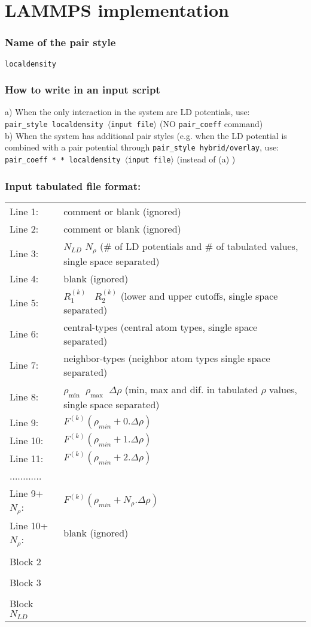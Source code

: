 \documentclass[12pt,a4paper]{article}
\begin{document}
\section*{LAMMPS implementation}
\subsubsection*{Name of the pair style}
\texttt{localdensity}
%
\subsubsection*{How to write in an input script}
a) When the only interaction in the system are LD potentials, use:\\
\texttt{pair\_style localdensity $\langle$input file$\rangle$} (NO \texttt{pair\_coeff} command)\\

\noindent b) When the system has additional pair styles (e.g. when the LD potential is combined with a pair potential through \texttt{pair\_style hybrid/overlay}, use:\\
\texttt{pair\_coeff *  * localdensity $\langle$input file$\rangle$} (instead of (a) )

\subsubsection*{Input tabulated file format:}
\begin{tabular}{l l}
Line 1:   & comment or blank (ignored)\\
Line 2:  & comment or blank (ignored)\\
Line 3:  & $N_{LD}$ $N_{\rho}$ (\# of LD potentials and \# of tabulated values, single space separated)\\
Line 4:  & blank (ignored)\\
Line 5:  & $R_1^{(k)} \; \; \; R_2^{(k)}$ (lower and upper cutoffs, single space separated)\\
Line 6: 	& central-types (central atom types, single space separated)\\
Line 7: 	& neighbor-types (neighbor atom types single space separated)\\
Line 8: 	& $\rho_{\mathrm{min}} \; \; \rho_{\mathrm{max}} \; \; \Delta \rho$ (min, max and dif. in tabulated $\rho$ values, single space separated)\\
Line 9: 	& $F^{(k)}(\rho_{min} + 0.\Delta \rho)$\\
Line 10:	& $F^{(k)}(\rho_{min} + 1.\Delta \rho)$\\
Line 11:	& $F^{(k)}(\rho_{min} + 2.\Delta \rho)$\\
............& { }\\
Line 9+$N_\rho$: &  $F^{(k)}(\rho_{min} + N_\rho . \Delta \rho)$\\	
Line 10+$N_\rho$: & blank (ignored)\\
\\
Block 2 & { }\\
\\
Block 3 & { }\\
\\
Block $N_{LD}$ & { }
\end{tabular}
\\
\end{document}
